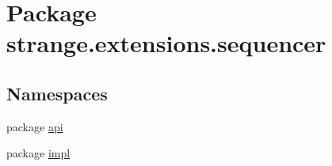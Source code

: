 \hypertarget{namespacestrange_1_1extensions_1_1sequencer}{\section{Package strange.\-extensions.\-sequencer}
\label{namespacestrange_1_1extensions_1_1sequencer}
}
\subsection*{Namespaces}
\begin{DoxyCompactItemize}
\item 
package \hyperlink{namespacestrange_1_1extensions_1_1sequencer_1_1api}{api}
\item 
package \hyperlink{namespacestrange_1_1extensions_1_1sequencer_1_1impl}{impl}
\end{DoxyCompactItemize}
